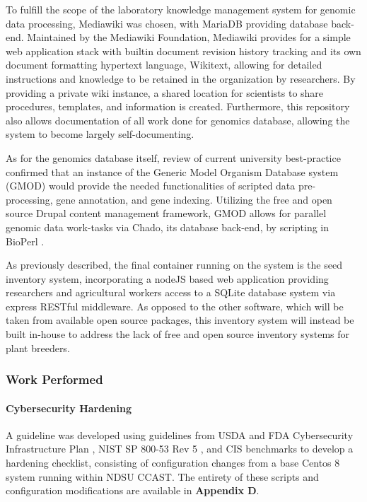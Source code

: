 \documentclass[12pt, letterpaper,oneocolumn]{article}
\begin{document}
To fulfill the scope of the laboratory knowledge management system for genomic data processing, Mediawiki \cite{wiki:xxx} was chosen, with MariaDB \cite{mariadb} providing database back-end. Maintained by the Mediawiki Foundation, Mediawiki provides for a simple web application stack with builtin document revision history tracking and its own document formatting hypertext language, Wikitext,  allowing for detailed instructions and knowledge to be retained in the organization by researchers. By providing a private wiki instance, a shared location for scientists to share procedures, templates, and information is created. Furthermore, this repository also allows documentation of all work done for genomics database, allowing the system to become largely self-documenting.

As for the genomics database itself, review of current university best-practice confirmed that an instance of the Generic Model Organism Database system (GMOD) \cite{GMOD} would provide the needed functionalities of scripted data pre-processing, gene annotation, and gene indexing. Utilizing the free and open source Drupal content management framework, GMOD allows for parallel genomic data work-tasks via Chado, its database back-end, by scripting in BioPerl \cite{bioperl}.

As previously described, the final container running on the system is the seed inventory system, incorporating a nodeJS based web application providing researchers and agricultural workers access to a SQLite database system via express RESTful \cite{REST} middleware. As opposed to the other software, which will be taken from available open source packages, this inventory system will instead be built in-house to address the lack of free and open source inventory systems for plant breeders.

\subsubsection{Work Performed}

\paragraph{Cybersecurity Hardening}

	A guideline was developed using guidelines from USDA and FDA Cybersecurity Infrastructure Plan \cite{sipp}, NIST SP 800-53 Rev 5 \cite{nist}, and CIS benchmarks \cite{cis} to develop a hardening checklist, consisting of configuration changes from a base Centos 8 system running within NDSU CCAST. The entirety of these scripts and configuration modifications are available in \textbf{Appendix D}.
\end{document}
